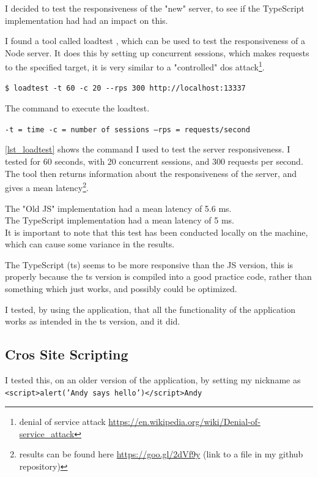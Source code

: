 \documentclass[a4paper]{article}
\begin{document}
I decided to test the responsiveness of the "new" server, to see if the TypeScript implementation had had an impact on this.

I found a tool called loadtest \cite{loadtest}, which can be used to test the responsiveness of a Node server. It does this by setting up concurrent sessions, which makes requests to the specified target, it is very similar to a "controlled" dos attack\footnote{ denial of service attack \url{https://en.wikipedia.org/wiki/Denial-of-service_attack}}.

\begin{listing}[H]
\centering
\begin{verbatim}
$ loadtest -t 60 -c 20 --rps 300 http://localhost:13337
\end{verbatim}
\caption{The command to execute the loadtest.}
\label{lst_loadtest}
\texttt{-t = time   -c = number of sessions  --rps = requests/second}
\end{listing}

\autoref{lst_loadtest} shows the command I used to test the server responsiveness. I tested for 60 seconds, with 20 concurrent sessions, and 300 requests per second.\\

The tool then returns information about the responsiveness of the server, and gives a mean latency\footnote{ results can be found here \url{https://goo.gl/2dVf9y} (link to a file in my github repository)}.

The "Old JS" implementation had a mean latency of 5.6 ms.\\
The TypeScript implementation had a mean latency of 5 ms.\\

It is important to note that this test has been conducted locally on the machine, which can cause some variance in the results.

The TypeScript (ts) seems to be more responsive than the JS version, this is properly because the ts version is compiled into a good practice code, rather than something which just works, and possibly could be optimized.

I tested, by using the application, that all the functionality of the application works as intended in the ts version, and it did.


\subsection{Cros Site Scripting}
I tested this, on an older version of the application, by setting my nickname as \texttt{<script>alert('Andy says hello')</script>Andy}
\end{document}

